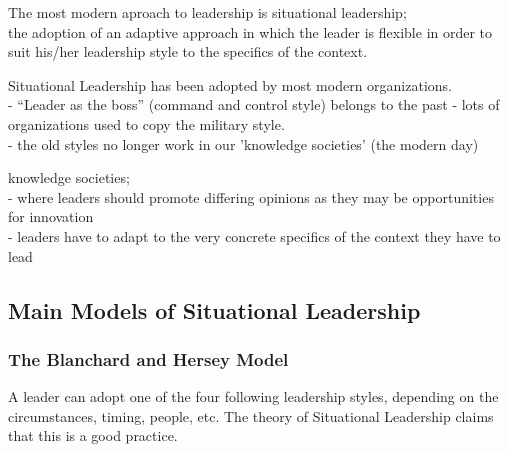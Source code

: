 \documentclass[]{project_plan}
\begin{document}
The most modern aproach to leadership is situational leadership;\\
the adoption of an adaptive approach in which the leader
is flexible in order to suit his/her leadership style to the specifics of the context.

Situational Leadership has been adopted by most modern organizations. \\
- “Leader as the boss” (command and control style) belongs to the past - lots of organizations used to copy the military style.\\
- the old styles no longer work in our 'knowledge societies' (the modern day)

knowledge societies;\\
- where leaders should promote differing opinions as they may be opportunities for innovation\\
- leaders have to adapt to the very concrete specifics of the context they have to lead

\newpage

\subsection{Main Models of Situational Leadership}

\subsubsection{The Blanchard and Hersey Model}

A leader can adopt one of the four following leadership styles, depending on
the circumstances, timing, people, etc. The theory of Situational Leadership
claims that this is a good practice.
\end{document}
